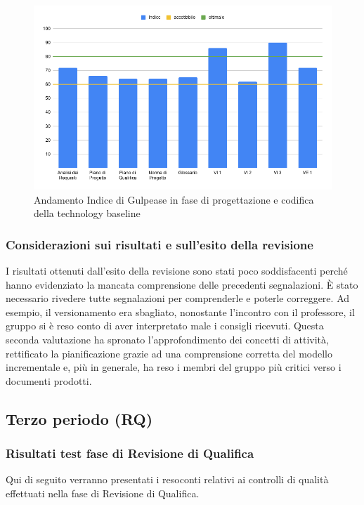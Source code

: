 \documentclass[../piano_di_qualifica.tex]{subfiles}
\begin{document}
\begin{figure}[H]
	\centering
	\includegraphics[width=14cm]{img/media_gul_RP.png}
	\caption{Andamento Indice di Gulpease in fase di progettazione e codifica della technology baseline}
\end{figure}

\subsubsection{Considerazioni sui risultati e sull’esito della revisione}
I risultati ottenuti dall'esito della revisione sono stati poco soddisfacenti perché hanno evidenziato la mancata comprensione delle precedenti segnalazioni. È stato necessario rivedere tutte segnalazioni per comprenderle e poterle correggere. Ad esempio, il versionamento era sbagliato, nonostante l'incontro con il professore, il gruppo si è reso conto di aver interpretato male i consigli ricevuti.
Questa seconda valutazione ha spronato l'approfondimento dei concetti di attività, rettificato la pianificazione grazie ad una comprensione corretta del modello incrementale e, più in generale, ha reso i membri del gruppo più critici verso i documenti prodotti.

\subsection{Terzo periodo (RQ)}
\label{sub:periodo-RQ}
\subsubsection{Risultati test fase di Revisione di Qualifica}
Qui di seguito verranno presentati i resoconti relativi ai controlli di qualità effettuati nella fase di Revisione di Qualifica. 
\end{document}

